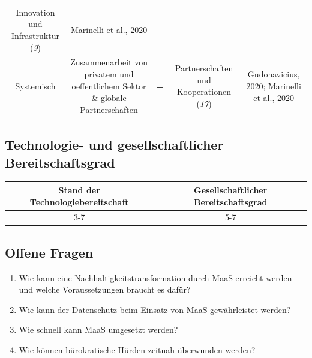\documentclass[
]{book}
\providecommand{\tightlist}{%
  \setlength{\itemsep}{0pt}\setlength{\parskip}{0pt}}
\begin{document}
\begin{longtable}[]{@{}ccccc@{}}
\begin{minipage}[t]{0.17\columnwidth}
Innovation und Infrastruktur (\emph{9})\strut
\end{minipage} & \begin{minipage}[t]{0.17\columnwidth}\centering
Marinelli et al., 2020\strut
\end{minipage}\tabularnewline
\begin{minipage}[t]{0.17\columnwidth}\centering
Systemisch\strut
\end{minipage} & \begin{minipage}[t]{0.16\columnwidth}\centering
Zusammenarbeit von privatem und oeffentlichem Sektor \& globale Partnerschaften\strut
\end{minipage} & \begin{minipage}[t]{0.17\columnwidth}\centering
\textbf{+}\strut
\end{minipage} & \begin{minipage}[t]{0.17\columnwidth}\centering
Partnerschaften und Kooperationen (\emph{17})\strut
\end{minipage} & \begin{minipage}[t]{0.17\columnwidth}\centering
Gudonavicius, 2020; Marinelli et al., 2020\strut
\end{minipage}\tabularnewline
\bottomrule
\end{longtable}

\hypertarget{technologie--und-gesellschaftlicher-bereitschaftsgrad-21}{%
\subsection*{Technologie- und gesellschaftlicher Bereitschaftsgrad}\label{technologie--und-gesellschaftlicher-bereitschaftsgrad-21}}

\begin{longtable}[]{@{}cc@{}}
\toprule
Stand der Technologiebereitschaft & Gesellschaftlicher Bereitschaftsgrad\tabularnewline
\midrule
\endhead
3-7 & 5-7\tabularnewline
\bottomrule
\end{longtable}

\hypertarget{offene-fragen-22}{%
\subsection*{Offene Fragen}\label{offene-fragen-22}}

\begin{enumerate}
\def\labelenumi{\arabic{enumi}.}
\tightlist
\item
  Wie kann eine Nachhaltigkeitstransformation durch MaaS erreicht werden und welche Voraussetzungen braucht es dafür?
\item
  Wie kann der Datenschutz beim Einsatz von MaaS gewährleistet werden?
\item
  Wie schnell kann MaaS umgesetzt werden?
\item
  Wie können bürokratische Hürden zeitnah überwunden werden?
\end{enumerate}
\end{document}
